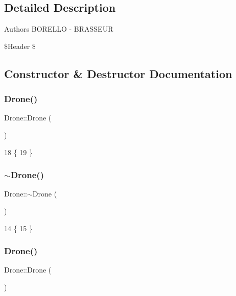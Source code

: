 \subsection{Detailed Description}
\begin{DoxyAuthor}{Authors}
B\+O\+R\+E\+L\+LO -\/ B\+R\+A\+S\+S\+E\+UR
\end{DoxyAuthor}
\$\+Header \$ 

\subsection{Constructor \& Destructor Documentation}
\mbox{\label{classDrone_ab692baa4be5c43b72990ce1b01bdc805}} 
\subsubsection{\texorpdfstring{Drone()}{Drone()}\hspace{0.1cm}{\footnotesize\ttfamily [1/2]}}
{\footnotesize\ttfamily Drone\+::\+Drone (\begin{DoxyParamCaption}{ }\end{DoxyParamCaption})}


\begin{DoxyCode}
18 \{
19 \}
\end{DoxyCode}
\mbox{\label{classDrone_a667075abb1eb5c54be6418884a387d14}} 
\subsubsection{\texorpdfstring{$\sim$\+Drone()}{~Drone()}\hspace{0.1cm}{\footnotesize\ttfamily [1/2]}}
{\footnotesize\ttfamily Drone\+::$\sim$\+Drone (\begin{DoxyParamCaption}{ }\end{DoxyParamCaption})}


\begin{DoxyCode}
14 \{
15 \}
\end{DoxyCode}
\mbox{\label{classDrone_ab692baa4be5c43b72990ce1b01bdc805}} 
\subsubsection{\texorpdfstring{Drone()}{Drone()}\hspace{0.1cm}{\footnotesize\ttfamily [2/2]}}
{\footnotesize\ttfamily Drone\+::\+Drone (\begin{DoxyParamCaption}{ }\end{DoxyParamCaption})}

